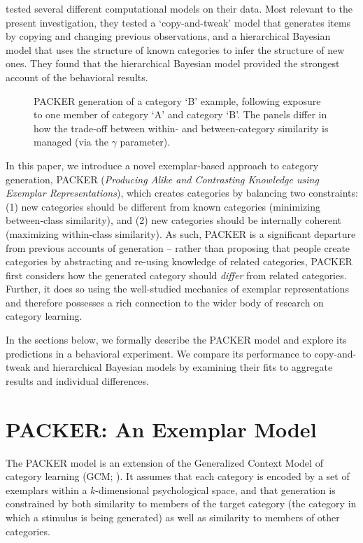 \documentclass[10pt,letterpaper]{article}
\newcommand\inputpgf[2]{{
\let\pgfimageWithoutPath\pgfimage
\renewcommand{\pgfimage}[2][]{\pgfimageWithoutPath[##1]{#1/##2}}

}}
\begin{document}
\citet{jern2013probabilistic} tested several different computational models on their data. Most relevant to the present investigation, they tested a `copy-and-tweak' model that generates items by copying and changing previous observations, and a hierarchical Bayesian model that uses the structure of known categories to infer the structure of new ones. They found that the hierarchical Bayesian model provided the strongest account of the behavioral results.


\begin{figure*}
    \begin{center}
    \inputpgf{figs/}{packer-examples.pgf}
    \caption{PACKER generation of a category `B' example, following exposure to one member of category `A' and category `B'. The panels differ in how the trade-off between within- and between-category similarity is managed (via the $\gamma$ parameter).}
    \label{fig:example-prob-spaces}
    \end{center}
\end{figure*}

In this paper, we introduce a novel exemplar-based approach to category generation, PACKER (\textit{Producing Alike and Contrasting Knowledge using Exemplar Representations}), which creates  categories by balancing two constraints: (1) new categories should be different from known categories (minimizing between-class similarity), and (2) new categories should be internally coherent (maximizing within-class similarity). As such, PACKER is a significant departure from previous accounts of generation -- rather than proposing that people create categories by abstracting and re-using knowledge of related categories, PACKER first considers how the generated category should \textit{differ} from related categories. Further, it does so using the well-studied mechanics of exemplar representations and therefore possesses a rich connection to the wider body of research on category learning.

In the sections below, we formally describe the PACKER model and explore its predictions in a behavioral experiment. We compare its performance to copy-and-tweak and hierarchical Bayesian models by examining their fits to aggregate results and individual differences.

\section{PACKER: An Exemplar Model}

The PACKER model is an extension of the Generalized Context Model of category learning (GCM; \citealp{nosofsky1984choice}). It assumes that each category is encoded by a set of exemplars within a $k$-dimensional psychological space, and that generation is constrained by both similarity to members of the target category (the category in which a stimulus is being generated) as well as similarity to members of other categories. 
\end{document}
